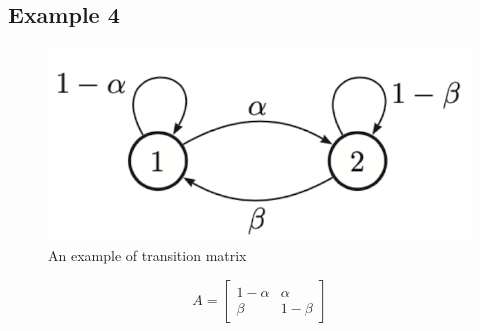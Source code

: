 \subsection{Example 4}
\begin{figure}[H]
    \centering
    \includegraphics[width = .4\linewidth]{figures/appendix/appendix_1.png}
    \caption{An example of transition matrix}
    \label{fig:transition-example}
\end{figure}
$$
A=\left[\begin{array}{cc}
1-\alpha & \alpha \\
\beta & 1-\beta
\end{array}\right]
$$